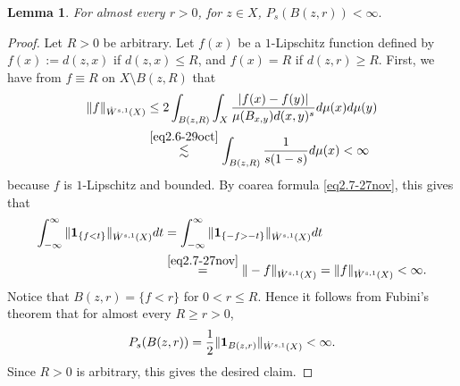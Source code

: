 \documentclass[11pt,leqno]{amsart}
\newtheorem{lemma}[theorem]{Lemma}
\numberwithin{equation}{section}
\theoremstyle{definition}
\begin{document}
	
	\begin{lemma}\label{lem3.15-dec}
		For almost every $r>0$, for $z\in X$,
		$
		{P_s(B(z,r))<\infty} .
		$
	\end{lemma}
	\begin{proof}
		Let $R>0$ be arbitrary. Let $f(x)$ be a $1$-Lipschitz function defined by $f(x):=d(z,x)$ if $d(z,x)\leq R$, and $f(x)=R$ if $d(z,r)\geq R$.
		First, we have from $f\equiv R$ on $X\setminus B(z,R)$ that
		\begin{align*}
			\|f\|_{\dot W^{s,1}(X)}&\leq 2 \int_{B(z,R)} \int_{X} \frac{|f(x)-f(y)|}{\mu(B_{x,y})d(x,y)^s}d\mu(x)d\mu(y)\\
			&\overset{\eqref{eq2.6-29oct}}\lesssim \int_{B(z,R)} \frac{1}{s(1-s)}  d\mu(x) <\infty
		\end{align*}
		because $f$ is $1$-Lipschitz and bounded.  By coarea formula \eqref{eq2.7-27nov}, this gives that 
		\begin{align*}
			\int_{-\infty}^\infty  \| {\bf 1}_{\{f<t\}} \|_{\dot W^{s,1}(X)} dt
			&=\int_{-\infty}^\infty \| {\bf 1}_{\{-f>-t\}} \|_{\dot W^{s,1}(X)} dt\\
			&\overset{\eqref{eq2.7-27nov}}{=}\|-f\|_{\dot W^{s,1}(X)}=\|f\|_{\dot W^{s,1}(X)}<\infty.
		\end{align*}
		Notice that $B(z,r)=\{ f<r\}$ for $0<r\leq R$. Hence it follows from Fubini's theorem that for almost every $R\geq r>0$, $${P_s(B(z,r))=\frac{1}{2} \| {\bf 1}_{B(z,r)}\|_{\dot W^{s,1}(X)}<\infty}.$$
		Since $R>0$ is arbitrary, this gives the desired claim.
	\end{proof}
	
\end{document}
